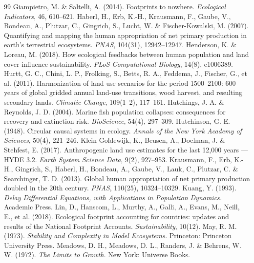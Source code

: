 \documentclass[11pt,a4paper]{article}
\begin{document}
\begin{thebibliography}{99}
 Giampietro, M. \& Saltelli, A. (2014). Footprints to nowhere. \emph{Ecological Indicators}, 46, 610--621.
 Haberl, H., Erb, K.-H., Krausmann, F., Gaube, V., Bondeau, A., Plutzar, C., Gingrich, S., Lucht, W. \& Fischer-Kowalski, M. (2007). Quantifying and mapping the human appropriation of net primary production in earth's terrestrial ecosystems. \emph{PNAS}, 104(31), 12942--12947.
 Henderson, K. \& Loreau, M. (2018). How ecological feedbacks between human population and land cover influence sustainability. \emph{PLoS Computational Biology}, 14(8), e1006389.
 Hurtt, G. C., Chini, L. P., Frolking, S., Betts, R. A., Feddema, J., Fischer, G., et al. (2011). Harmonization of land-use scenarios for the period 1500--2100: 600 years of global gridded annual land-use transitions, wood harvest, and resulting secondary lands. \emph{Climatic Change}, 109(1--2), 117--161.
 Hutchings, J. A. \& Reynolds, J. D. (2004). Marine fish population collapses: consequences for recovery and extinction risk. \emph{BioScience}, 54(4), 297--309.
 Hutchinson, G. E. (1948). Circular causal systems in ecology. \emph{Annals of the New York Academy of Sciences}, 50(4), 221--246.
 Klein Goldewijk, K., Beusen, A., Doelman, J. \& Stehfest, E. (2017). Anthropogenic land use estimates for the last 12,000 years --- HYDE 3.2. \emph{Earth System Science Data}, 9(2), 927--953.
 Krausmann, F., Erb, K.-H., Gingrich, S., Haberl, H., Bondeau, A., Gaube, V., Lauk, C., Plutzar, C. \& Searchinger, T. D. (2013). Global human appropriation of net primary production doubled in the 20th century. \emph{PNAS}, 110(25), 10324--10329.
 Kuang, Y. (1993). \emph{Delay Differential Equations, with Applications in Population Dynamics.} Academic Press.
 Lin, D., Hanscom, L., Murthy, A., Galli, A., Evans, M., Neill, E., et al. (2018). Ecological footprint accounting for countries: updates and results of the National Footprint Accounts. \emph{Sustainability}, 10(12).
 May, R. M. (1973). \emph{Stability and Complexity in Model Ecosystems.} Princeton: Princeton University Press.
 Meadows, D. H., Meadows, D. L., Randers, J. \& Behrens, W. W. (1972). \emph{The Limits to Growth.} New York: Universe Books.

\end{thebibliography}
\end{document}
